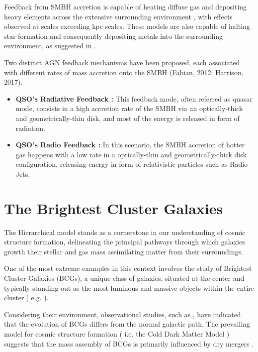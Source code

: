 Feedback from SMBH accretion is capable of heating diffuse gas \cite{2005Natur.433..604D} and depositing heavy elements across the extensive surrounding environment \cite{2000ApJ...539L..13G}, with effects observed at scales exceeding kpc scales. 
These models are also capable of halting star formation and consequently depositing metals into the surrounding environment, as suggested in \cite{2000ApJ...539L..13G}.


Two distinct AGN feedback mechanisms have been proposed, each associated with different rates of mass accretion onto the SMBH (Fabian, 2012; Harrison, 2017).
\begin{itemize}
	\item \textbf{QSO's Radiative Feedback :} This feedback mode, often referred as quasar mode, consists in a high accretion 		rate of the SMBH via an optically-thick and geometrically-thin disk, and most of the energy is released in form of radiation.
	\item \textbf{QSO's Radio Feedback :} In this scenario, the SMBH accretion of hotter gas happens with a low rate in a optically-thin and geometrically-thick disk configuration, releasing energy in form of relativistic particles such as Radio Jets.
\end{itemize}



\section{The Brightest Cluster Galaxies }
The Hierarchical model stands as a cornerstone in our understanding of cosmic structure formation, delineating the principal pathways through which galaxies growth their stellar and gas mass assimilating matter from their surroundings.

One of the most extreme examples in this context involves the study of Brightest Cluster Galaxies (BCGs), a unique class of galaxies, situated at the center and typically standing out as the most luminous and massive objects within the entire cluster.( e.g. \cite{2015MNRAS.448....2W} ).

Considering their environment, observational studies, such as \cite{2020MNRAS.498.2719T}, have indicated that the evolution of BCGs differs from the normal galactic path. The prevailing model for cosmic structure formation ( i.e. the Cold Dark Matter Model ) suggests that the mass assembly of BCGs is primarily influenced by dry mergers \cite{2007MNRAS.375....2D, 2019ApJ...881..150C}.

